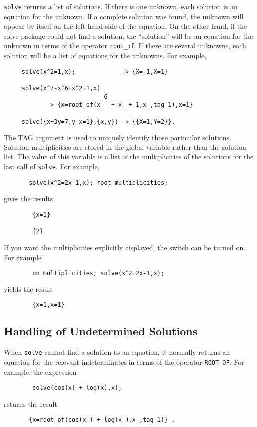 \hypertarget{operator:ROOT_OF}{}
\texttt{solve} returns a list of solutions.  If there is one unknown, each
solution is an equation for the unknown.  If a complete solution was
found, the unknown will appear by itself on the left-hand side of the
equation.  On the other hand, if the solve package could not find a
solution, the ``solution'' will be an equation for the unknown in terms
of the operator \texttt{root\_of}. If there
are several unknowns, each solution will be a list of equations for the
unknowns.  For example,
\begin{verbatim}
     solve(x^2=1,x);             -> {X=-1,X=1}

     solve(x^7-x^6+x^2=1,x)
                            6
            -> {x=root_of(x_  + x_ + 1,x_,tag_1),x=1}

     solve({x+3y=7,y-x=1},{x,y}) -> {{X=1,Y=2}}.
\end{verbatim}
\hypertarget{reserved:ROOT_MULTIPLICITIES}{}
The TAG argument is used to uniquely identify those particular solutions.
Solution multiplicities are stored in the global variable
 rather than the solution list.  The value of this
variable is a list of the multiplicities of the solutions for the last
call of \texttt{solve}.  For example,
\begin{verbatim}
       solve(x^2=2x-1,x); root_multiplicities;
\end{verbatim}
gives the results
\begin{verbatim}
        {x=1}

        {2}
\end{verbatim}

\hypertarget{switch:MULTIPLICITIES}{}
If you want the multiplicities explicitly displayed, the switch
 can be turned on. For example
\begin{verbatim}
        on multiplicities; solve(x^2=2x-1,x);
\end{verbatim}
yields the result
\begin{verbatim}
        {x=1,x=1}
\end{verbatim}

\subsection{Handling of Undetermined Solutions}
When \texttt{solve} cannot find a solution to an equation, it normally
returns an equation for the relevant indeterminates in terms of the
operator \texttt{ROOT\_OF}.  For example, the expression
\begin{verbatim}
        solve(cos(x) + log(x),x);
\end{verbatim}
returns the result
\begin{verbatim}
       {x=root_of(cos(x_) + log(x_),x_,tag_1)} .
\end{verbatim}

